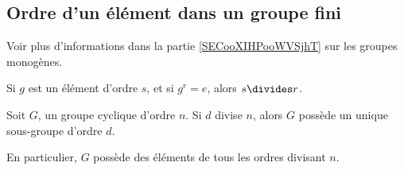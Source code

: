 \subsection{Ordre d'un élément dans un groupe fini}

Voir plus d'informations dans la partie \ref{SECooXIHPooWVSjhT} sur les groupes monogènes.

\begin{lemma}		\label{LEMooRFKQooWTdYcr}
	Si \( g\) est un élément d'ordre \( s\), et si \( g^r=e\), alors \( s\divides r\).
\end{lemma}

\begin{theorem}    \label{THOooSUWKooICbzqM}
	Soit \( G\), un groupe cyclique d'ordre \( n\). Si \( d\) divise \( n\), alors \( G\) possède un unique sous-groupe d'ordre \( d\).

	En particulier, \( G\) possède des éléments de tous les ordres divisant \( n\).
\end{theorem}

